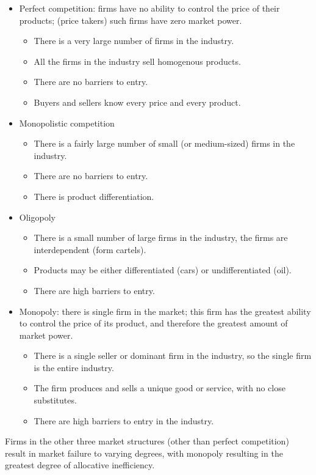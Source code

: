 \documentclass[a4paper,12pt]{article}
\begin{document}
\begin{itemize}
  \item Perfect competition: firms have no ability to control the price of their products; (price takers) such firms have zero market power.
  \begin{itemize}
    \item There is a very large number of firms in the industry.
    \item All the firms in the industry sell homogenous products.
    \item There are no barriers to entry.
\item Buyers and sellers know every price and every product.
  \end{itemize}
  \item Monopolistic competition
  \begin{itemize}
    \item There is a fairly large number of small (or medium-­sized) firms in the industry.
    \item There are no barriers to entry.
    \item There is product differentiation.
  \end{itemize}
  \item Oligopoly
  \begin{itemize}
    \item There is a small number of large firms in the industry, the firms are interdependent (form cartels).
    \item Products may be either differentiated (cars) or undifferentiated (oil).
    \item There are high barriers to entry.
  \end{itemize}
  \item Monopoly: there is single firm in the market; this firm has the greatest ability to control the price of its product, and therefore the greatest amount of market power.
  \begin{itemize}
    \item There is a single seller or dominant firm in the industry, so the single firm is the entire industry.
    \item The firm produces and sells a unique good or service, with no close substitutes.
    \item There are high barriers to entry in the industry.
  \end{itemize}
\end{itemize}
Firms in the other three market structures (other than perfect competition) result in market failure to varying degrees, with monopoly resulting in the greatest degree of allocative inefficiency.\\
\end{document}
